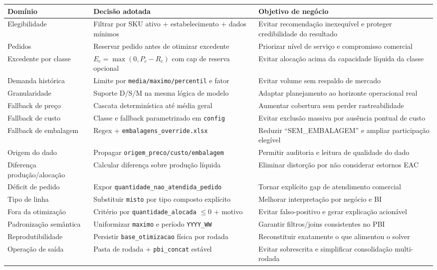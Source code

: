 \documentclass[11pt,a4paper]{article}
\begin{document}
\begin{longtable}{p{3.8cm}p{5.4cm}p{6.0cm}}
\toprule
\textbf{Domínio} & \textbf{Decisão adotada} & \textbf{Objetivo de negócio} \\
\midrule
\endhead
Elegibilidade & Filtrar por SKU ativo + estabelecimento + dados mínimos & Evitar recomendação inexequível e proteger credibilidade do resultado \\
Pedidos & Reservar pedido antes de otimizar excedente & Priorizar nível de serviço e compromisso comercial \\
Excedente por classe & $E_c=\max(0,P_c-R_c)$ com cap de reserva opcional & Evitar alocação acima da capacidade líquida da classe \\
Demanda histórica & Limite por \texttt{media/maximo/percentil} e fator & Evitar volume sem respaldo de mercado \\
Granularidade & Suporte D/S/M na mesma lógica de modelo & Adaptar planejamento ao horizonte operacional real \\
Fallback de preço & Cascata determinística até média geral & Aumentar cobertura sem perder rastreabilidade \\
Fallback de custo & Classe e fallback parametrizado em \texttt{config} & Evitar exclusão massiva por ausência pontual de custo \\
Fallback de embalagem & Regex + \texttt{embalagens\_override.xlsx} & Reduzir ``SEM\_EMBALAGEM'' e ampliar participação elegível \\
Origem do dado & Propagar \texttt{origem\_preco/custo/embalagem} & Permitir auditoria e leitura de qualidade do dado \\
Diferença produção/alocação & Calcular diferença sobre produção líquida & Eliminar distorção por não considerar estornos EAC \\
Déficit de pedido & Expor \texttt{quantidade\_nao\_atendida\_pedido} & Tornar explícito gap de atendimento comercial \\
Tipo de linha & Substituir \texttt{misto} por tipo composto explícito & Melhorar interpretação por negócio e BI \\
Fora da otimização & Critério por \texttt{quantidade\_alocada} \(\le 0\) + motivo & Evitar falso-positivo e gerar explicação acionável \\
Padronização semântica & Uniformizar \texttt{maximo} e período \texttt{YYYY\_WW} & Garantir filtros/joins consistentes no PBI \\
Reprodutibilidade & Persistir \texttt{base\_otimizacao} física por rodada & Reconstituir exatamente o que alimentou o solver \\
Operação de saída & Pasta de rodada + \texttt{pbi\_concat} estável & Evitar sobrescrita e simplificar consolidação multi-rodada \\
\bottomrule
\end{longtable}
\end{document}

